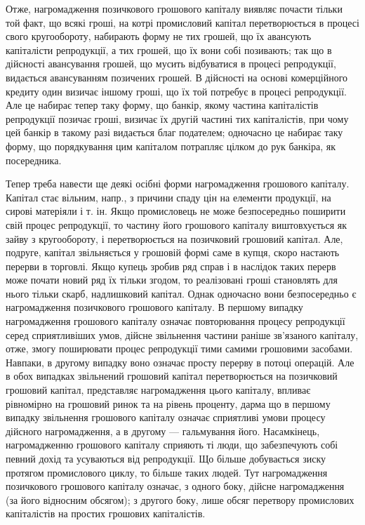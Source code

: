 Отже, нагромадження позичкового грошового капіталу виявляє почасти
тільки той факт, що всякі гроші, на котрі промисловий капітал перетворюється
в процесі свого кругообороту, набирають форму не тих грошей, що їх
авансують капіталісти репродукції, а тих грошей, що їх вони собі позивають;
так що в дійсності авансування грошей, що мусить відбуватися в процесі
репродукції, видається авансуванням позичених грошей. В дійсності на
основі комерційного кредиту один визичає іншому гроші, що їх той потребує
в процесі репродукції. Але це набирає тепер таку форму, що банкір, якому
частина капіталістів репродукції позичає гроші, визичає їх другій частині
тих капіталістів, при чому цей банкір в такому разі видається благ подателем;
одночасно це набирає таку форму, що порядкування цим капіталом потрапляє
цілком до рук банкіра, як посередника.

Тепер треба навести ще деякі осібні форми нагромадження грошового
капіталу. Капітал стає вільним, напр., з причини спаду цін на елементи продукції,
на сирові матеріяли і т. ін. Якщо промисловець не може безпосередньо поширити
свій процес репродукції, то частину його грошового капіталу виштовхується
як зайву з кругообороту, і перетворюється на позичковий грошовий капітал.
Але, подруге, капітал звільняється у грошовій формі саме в купця, скоро
настають перерви в торговлі. Якщо купець зробив ряд справ і в наслідок таких
перерв може почати новий ряд їх тільки згодом, то реалізовані гроші становлять
для нього тільки скарб, надлишковий капітал. Однак одночасно вони безпосередньо
є нагромадження позичкового грошового капіталу. В першому випадку нагромадження
грошового капіталу означає повторювання процесу репродукції серед
сприятливіших умов, дійсне звільнення частини раніше зв’язаного капіталу,
отже, змогу поширювати процес репродукції тими самими грошовими засобами.
Навпаки, в другому випадку воно означає просту перерву в потоці операцій.
Але в обох випадках звільнений грошовий капітал перетворюється на позичковий
грошовий капітал, представляє нагромадження цього капіталу, впливає рівномірно
на грошовий ринок та на рівень проценту, дарма що в першому випадку
звільнення грошового капіталу означає сприятливі умови процесу дійсного нагромадження,
а в другому — гальмування його. Насамкінець, нагромадженню грошового
капіталу сприяють ті люди, що забезпечують собі певний дохід та усуваються від
репродукції. Що більше добувається зиску протягом промислового циклу, то більше
таких людей. Тут нагромадження позичкового грошового капіталу означає, з одного
боку, дійсне нагромадження (за його відносним обсягом); з другого боку,
лише обсяг перетвору промислових капіталістів на простих грошових капіталістів.

